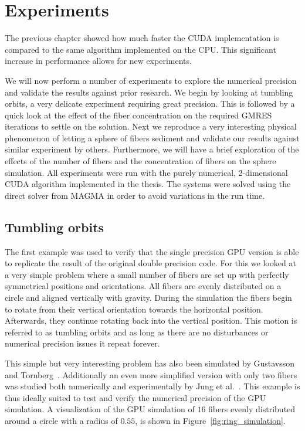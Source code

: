 \chapter{Experiments}
\label{cha:experiments}

The previous chapter showed how much faster the CUDA implementation is compared to the same algorithm implemented on the CPU. This significant increase in performance allows for new experiments.

We will now perform a number of experiments to explore the numerical precision and validate the results against prior research. We begin by looking at tumbling orbits, a very delicate experiment requiring great precision. This is followed by a quick look at the effect of the fiber concentration on the required GMRES iterations to settle on the solution. Next we reproduce a very interesting physical phenomenon of letting a sphere of fibers sediment and validate our results against similar experiment by others. Furthermore, we will have a brief exploration of the effects of the number of fibers and the concentration of fibers on the sphere simulation. All experiments were run with the purely numerical, 2-dimensional CUDA algorithm  implemented in the thesis. The systems were solved using the direct solver from MAGMA in order to avoid variations in the run time.

\section{Tumbling orbits}
\label{sec:example_ring}

The first example was used to verify that the single precision GPU version is able to replicate the result of the original double precision code. For this we looked at a very simple problem where a small number of fibers are set up with perfectly symmetrical positions and orientations. All fibers are evenly distributed on a circle and aligned vertically with gravity. During the simulation the fibers begin to rotate from their vertical orientation towards the horizontal position. Afterwards, they continue rotating back into the vertical position. This motion is referred to as tumbling orbits and as long as there are no disturbances or numerical precision issues it repeat forever.

This simple but very interesting problem has also been simulated by Gustavsson and Tornberg~\cite{Gustavsson2009}. Additionally an even more simplified version with only two fibers was studied both numerically and experimentally by Jung et al.~\cite{Jung2006}. This example is thus ideally suited to test and verify the numerical precision of the GPU simulation. A visualization of the GPU simulation of $16$ fibers evenly distributed around a circle with a radius of $0.55$, is shown in Figure~\ref{fig:ring_simulation}.

